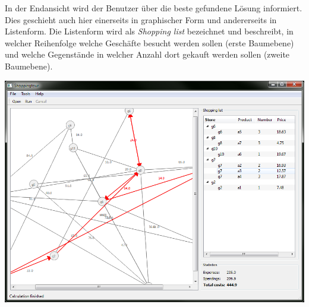 \newpage

In der Endansicht wird der Benutzer über die beste gefundene Lösung informiert. Dies geschieht auch hier einerseits in graphischer Form und andererseits in Listenform. Die Listenform wird als \emph{Shopping list} bezeichnet und beschreibt, in welcher Reihenfolge welche Geschäfte besucht werden sollen (erste Baumebene) und welche Gegenstände in welcher Anzahl dort gekauft werden sollen (zweite Baumebene).

\includegraphics[width=1\textwidth]{resourcen/walkthrough/5-finished-clingo.png}

\newpage